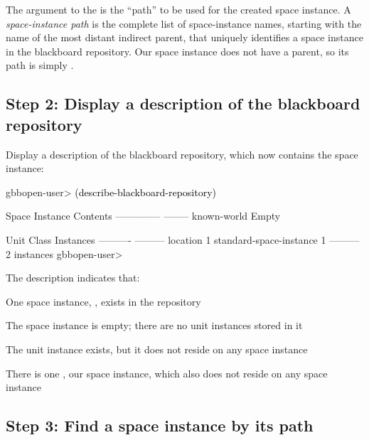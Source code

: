 \documentclass[10pt,twoside,english,pdftex]{article}
\begin{document}
The argument to the  is the ``path'' to be
used for the created space instance.  A \textit{space-instance path} is the
complete list of space-instance names, starting with the name of the most
distant indirect parent, that uniquely identifies a space instance in the
blackboard repository.  Our  space instance does not
have a parent, so its path is simply .

\subsection*{Step 2: Display a description of the blackboard repository}

%
%
%
Display a description of the blackboard repository, which now contains the
 space instance:
%
\W\supp
\begin{example}
\textcolor{darkergray}{%
  gbbopen-user> \textcolor{black}{(describe-blackboard-repository)}
  
  Space Instance                Contents
  --------------                --------
  known-world                   Empty

  Unit Class                    Instances
  ----------                    ---------
  location                              1
  standard-space-instance               1
                                ---------
                                        2 instances
  gbbopen-user>}
\end{example}

The description indicates that:
\begin{tightitemize}
\item One space instance, , exists in the repository
\item The  space instance is empty; there are no unit
  instances stored in it
\item The  unit instance exists, but it does not reside
  on any space instance
\item There is one , our
   space instance, which also does not reside on any
  space instance
\end{tightitemize}
 
\subsection*{Step 3: Find a space instance by its path}
\end{document}
